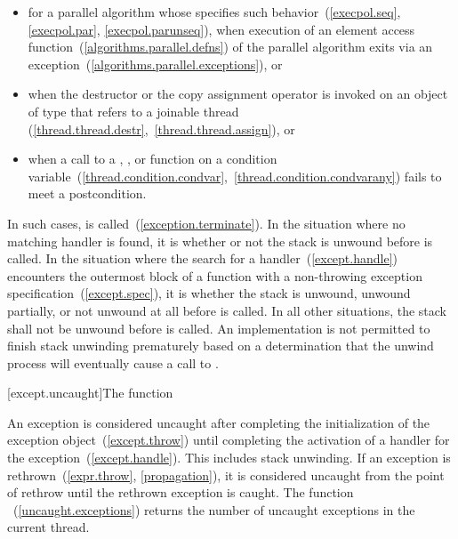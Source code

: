 \begin{note}
\begin{itemize}
\item%
for a parallel algorithm whose  specifies such
behavior~(\ref{execpol.seq}, \ref{execpol.par}, \ref{execpol.parunseq}),
when execution of an element access function~(\ref{algorithms.parallel.defns})
of the parallel algorithm exits via an exception~(\ref{algorithms.parallel.exceptions}), or

\item%
when the destructor or the copy assignment operator is invoked on an object
of type  that refers to a joinable thread
(\ref{thread.thread.destr},~\ref{thread.thread.assign}), or

\item%
when a call to a , , or 
function on a condition variable~(\ref{thread.condition.condvar},~\ref{thread.condition.condvarany})
fails to meet a postcondition.

\end{itemize}

\end{note}

\pnum
{}%
In such cases,
is called~(\ref{exception.terminate}).
In the situation where no matching handler is found, it is
 whether or not the
stack is unwound
before
is called.
In the situation where the search for a handler~(\ref{except.handle}) encounters the
outermost block of a function
with a non-throwing exception specification~(\ref{except.spec}), it is
whether the stack is unwound, unwound partially, or not unwound at all
before  is called.
In all other situations, the stack shall not be unwound before
is called.
An implementation is not permitted to finish stack unwinding
prematurely based on a determination that the unwind process
will eventually cause a call to
.

[except.uncaught]{The  function}%

\pnum
An exception is considered uncaught
after completing the initialization of the exception object~(\ref{except.throw})
until completing the activation of a handler for the exception~(\ref{except.handle}).
This includes stack unwinding.
If an exception is rethrown~(\ref{expr.throw}, \ref{propagation}),
it is considered uncaught from the point of rethrow
until the rethrown exception is caught.
The function ~(\ref{uncaught.exceptions})
returns the number of uncaught exceptions in the current thread.%
